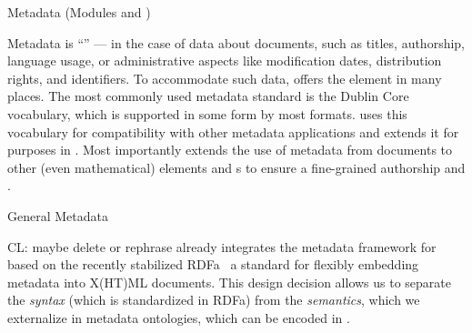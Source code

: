 
\begin{tchapter}[id=metadata,short=Metadata]{Metadata (Modules {} and  {})}

  Metadata is ``{}'' --- in the case of {\omdoc}
  data about documents, such as titles, authorship, language usage, or administrative
  aspects like modification dates, distribution rights, and identifiers. To accommodate
  such data, {\omdoc} offers the {} element in many places. The most
  commonly used metadata standard is the Dublin Core vocabulary, which is supported in
  some form by most formats. {\omdoc} uses this vocabulary for compatibility with other
  metadata applications and extends it for {} purposes in
  {\omdoc}.  Most importantly {\omdoc} extends the use of metadata from documents to other
  (even mathematical) elements and {s} to ensure a
  fine-grained authorship and {}.

\begin{tsection}{General Metadata}\label{sec:genmeta}
  \begin{oldpart}{CL: maybe delete or rephrase}
    {} already integrates the metadata framework for
    {} based on the recently stabilized
    RDFa~\cite{AdidaEtAl08:RDFa} a standard for flexibly embedding
    metadata into X(HT)ML documents. This design decision allows us to
    separate the {\emph{syntax}} (which is standardized in RDFa) from
    the {\emph{semantics}}, which we externalize in metadata
    ontologies, which can be encoded in {\omdoc}.
  \end{oldpart}


\newcommand{\xcmd}[1]{#1\xspace }
\newcommand{\ncmd}[1]{\mbox{#1}}
\newcommand{\xncmd}[1]{\xcmd{\ncmd{#1}}}
\newcommand{\ccrel}{\xncmd{ccREL}}
\newcommand{\curie}{\xncmd{CURIE}}
\newcommand{\curies}{\xncmd{CURIEs}}
\newcommand{\dcmi}{\xncmd{DCMI}}
\newcommand{\mmt}{\xncmd{MMT}}
\newcommand{\rdfs}{\xncmd{RDFS}}
\newcommand{\uris}{\xncmd{URIs}}
\newcommand{\cf}[1][\ ]{cf.#1}
\newcommand{\eg}[1][\ ]{e.\,g.#1}
\newcommand{\ie}[1][\ ]{i.\,e.#1}
\newcommand{\wrt}[1][\ ]{w.\,r.\,t.#1}
\newcommand{\identifier}[1]{\ifmmode\mathit{#1}\else\textit{#1\/}\fi}
\newcommand{\person}[1]{\textsc{#1}}


\end{tsection}
\end{tchapter}
